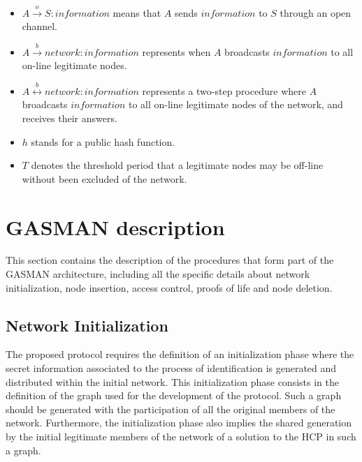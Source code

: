 \documentclass[conference]{IEEEtran}
\begin{document}
\begin{itemize}
\item $A \stackrel{o}{\rightarrow} S: information $  means that $ A $ sends $information$
to $S$ through an open channel.

\item $A \stackrel{b}{\rightarrow} network: information $ represents when $
A $ broadcasts $information$ to all on-line legitimate nodes.

\item $A \stackrel{b}{\leftrightarrow} network:
information $ represents a two-step procedure where $ A $
broadcasts $information$ to all on-line legitimate nodes of the
network, and receives their answers.

\item $h$ stands for a public hash function.

\item $T$ denotes the
threshold period that a legitimate nodes may be off-line without been excluded of the network.

\end{itemize}

\section{GASMAN description}
\label{ElementsDescription}
This section contains the description of the procedures that form part of the GASMAN architecture, including all the specific details
about network initialization, node insertion, access control,
proofs of life and node deletion.
\subsection{Network Initialization}

The proposed protocol requires the
definition of an initialization phase where the secret information
associated to the process of identification is generated and
distributed within the initial network. This initialization phase
consists in the definition of the graph used for the development
of the protocol. Such a graph should be generated with the participation of all the original members of the
network. Furthermore, the initialization phase also implies the shared generation by the initial legitimate members of the network of a solution to the HCP in such a graph.
\end{document}

